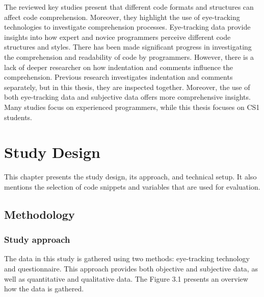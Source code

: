 The reviewed key studies present that different code formats and structures can affect code comprehension. Moreover, they highlight the use of eye-tracking technologies to investigate comprehension processes.  Eye-tracking data provide insights into how expert and novice programmers perceive different code structures and styles. There has been made significant progress in investigating the comprehension and readability of code by programmers.  However, there is a lack of deeper researcher on how indentation and comments influence the comprehension.  Previous research investigates indentation and comments separately, but in this thesis, they are inspected together. Moreover, the use of both eye-tracking data and subjective data offers more comprehensive insights. Many studies focus on experienced programmers, while this thesis focuses on CS1 students. 





\chapter{Study Design}

This chapter presents the study design, its approach, and technical setup.  It also mentions the selection of code snippets and variables that are used for evaluation.

\section{Methodology}

\subsection{Study approach} The data in this study is gathered using two methods: eye-tracking technology and questionnaire. This approach provides both objective and subjective data, as well as quantitative and qualitative data. The Figure 3.1 presents an overview how the data is gathered. 




